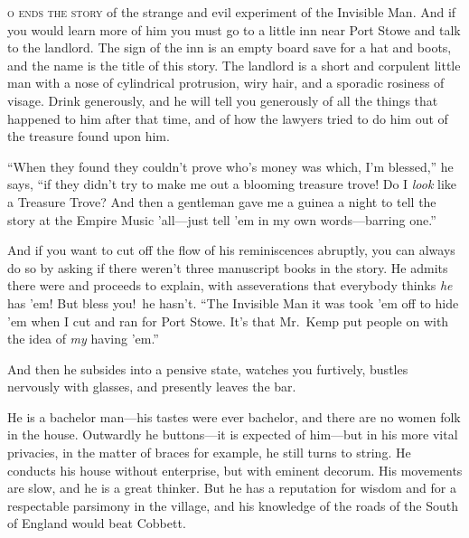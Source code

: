 \cleartorecto
\label{ch:epilogue}
\begin{ChapterStart}
\vspace*{2\nbs}

\ChapterTitle{}
\vspace{1.5\nbs}
\end{ChapterStart}

\kern-3pt\textsc{o ends the story} of the strange and evil experiment of the Invisible Man. And if you would learn more of him you must go to a little inn near Port Stowe and talk to the landlord. The sign of the inn is an empty board save for a hat and boots, and the name is the title of this story. The landlord is a short and corpulent little man with a nose of cylindrical protrusion, wiry hair, and a sporadic rosiness of visage. Drink generously, and he will tell you generously of all the things that happened to him after that time, and of how the lawyers tried to do him out of the treasure found upon him.

“When they found they couldn’t prove who’s money was which, I’m blessed,” he says, “if they didn’t try to make me out a blooming treasure trove! Do I \emph{look} like a Treasure Trove? And then a gentleman gave me a guinea a night to tell the story at the Empire Music ’all—just tell ’em in my own words—barring one.”

And if you want to cut off the flow of his reminiscences abruptly, you can always do so by asking if there weren’t three manuscript books in the story. He admits there were and proceeds to explain, with asseverations that everybody thinks \emph{he} has ’em! But bless you!\ he hasn’t. “The Invisible Man it was took ’em off to hide ’em when I cut and ran for Port Stowe. It’s that Mr.\ Kemp put people on with the idea of \emph{my} having ’em.”

And then he subsides into a pensive state, watches you furtively, bustles nervously with glasses, and presently leaves the bar.

He is a bachelor man—his tastes were ever bachelor, and there are no women folk in the house. Outwardly he buttons—it is expected of him—but in his more vital privacies, in the matter of braces for example, he still turns to string. He conducts his house without enterprise, but with eminent decorum. His movements are slow, and he is a great thinker. But he has a reputation for wisdom and for a respectable parsimony in the village, and his knowledge of the roads of the South of England would beat Cobbett.

